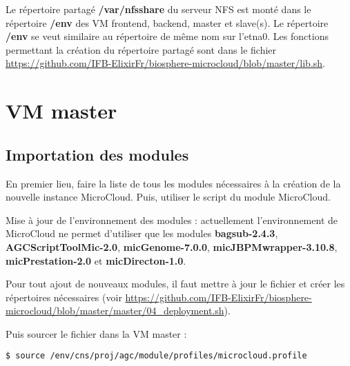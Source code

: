 Le répertoire partagé \textbf{/var/nfsshare} du serveur NFS est monté dans le répertoire \textbf{/env}
des VM frontend, backend, master et slave(s).
Le répertoire \textbf{/env} se veut similaire au répertoire de même nom sur l’etna0. 
Les fonctions permettant la création du répertoire partagé sont dans le fichier \url{https://github.com/IFB-ElixirFr/biosphere-microcloud/blob/master/lib.sh}.

\section{VM master}

\subsection{Importation des modules}
En premier lieu, faire la liste de tous les modules nécessaires à la création de la nouvelle instance MicroCloud.
Puis, utiliser le script  du module MicroCloud.

Mise à jour de l'environnement des modules :
actuellement l'environnement de MicroCloud ne permet d'utiliser que les modules \textbf{bagsub-2.4.3}, \textbf{AGCScriptToolMic-2.0}, \textbf{micGenome-7.0.0}, \textbf{micJBPMwrapper-3.10.8}, \textbf{micPrestation-2.0} et \textbf{micDirecton-1.0}.
\newline

\begin{mycolorbox}
	Pour tout ajout de nouveaux modules, il faut mettre à jour le fichier  et créer les répertoires nécessaires (voir \url{https://github.com/IFB-ElixirFr/biosphere-microcloud/blob/master/master/04_deployment.sh}).
\end{mycolorbox}

Puis sourcer le fichier  dans la VM master :
\begin{lstlisting}[style=bash]
$ source /env/cns/proj/agc/module/profiles/microcloud.profile
\end{lstlisting}

